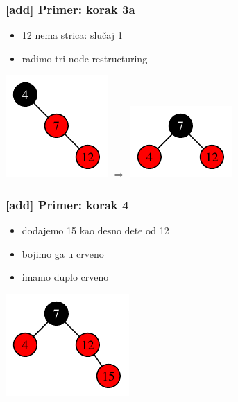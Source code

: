 \documentclass[compress,aspectratio=169]{beamer}
\begin{document}
\begin{frame}[fragile]
  \frametitle{[add] Primer: korak 3a}
  \begin{itemize}
    \item 12 nema strica: slučaj 1
    \item radimo tri-node restructuring
  \end{itemize}
  \begin{center}
    \includegraphics[scale=1.0]{asp-11-add-03.pdf} $\Rightarrow$
    \includegraphics[scale=1.0]{asp-11-add-04.pdf}
  \end{center}
\end{frame}

\begin{frame}[fragile]
  \frametitle{[add] Primer: korak 4}
  \begin{itemize}
    \item dodajemo 15 kao desno dete od 12
    \item bojimo ga u crveno
    \item imamo duplo crveno
  \end{itemize}
  \begin{center}
    \includegraphics[scale=1.0]{asp-11-add-05.pdf}
  \end{center}
\end{frame}
\end{document}
